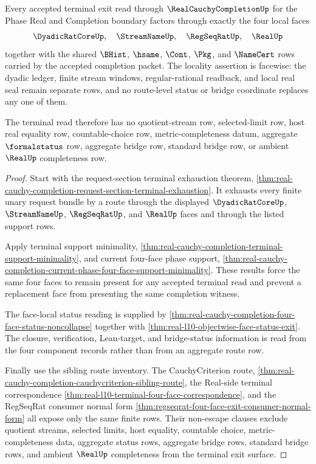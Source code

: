 \begin{theorem}
\label{thm:real-cauchy-completion-terminal-exit-locality}
Every accepted terminal exit read through $\RealCauchyCompletionUp$ for the Phase Real and Completion boundary factors through exactly the four local faces
$$
\DyadicRatCoreUp,\quad \StreamNameUp,\quad \RegSeqRatUp,\quad \RealUp
$$
together with the shared $\BHist$, $\hsame$, $\Cont$, $\Pkg$, and $\NameCert$ rows carried by the accepted completion packet. The locality assertion is facewise: the dyadic ledger, finite stream windows, regular-rational readback, and local real seal remain separate rows, and no route-level status or bridge coordinate replaces any one of them.

The terminal read therefore has no quotient-stream row, selected-limit row, host real equality row, countable-choice row, metric-completeness datum, aggregate $\formalstatus$ row, aggregate bridge row, standard bridge row, or ambient $\RealUp$ completeness row.
\end{theorem}
\begin{proof}
Start with the request-section terminal exhaustion theorem, \autoref{thm:real-cauchy-completion-request-section-terminal-exhaustion}. It exhausts every finite unary request bundle by a route through the displayed $\DyadicRatCoreUp$, $\StreamNameUp$, $\RegSeqRatUp$, and $\RealUp$ faces and through the listed support rows.

Apply terminal support minimality, \autoref{thm:real-cauchy-completion-terminal-support-minimality}, and current four-face phase support, \autoref{thm:real-cauchy-completion-current-phase-four-face-support-minimality}. These results force the same four faces to remain present for any accepted terminal read and prevent a replacement face from presenting the same completion witness.

The face-local status reading is supplied by \autoref{thm:real-cauchy-completion-four-face-status-noncollapse} together with \autoref{thm:real-l10-objectwise-face-status-exit}. The closure, verification, Lean-target, and bridge-status information is read from the four component records rather than from an aggregate route row.

Finally use the sibling route inventory. The CauchyCriterion route, \autoref{thm:real-cauchy-completion-cauchycriterion-sibling-route}, the Real-side terminal correspondence \autoref{thm:real-l10-terminal-four-face-correspondence}, and the RegSeqRat consumer normal form \autoref{thm:regseqrat-four-face-exit-consumer-normal-form} all expose only the same finite rows. Their non-escape clauses exclude quotient streams, selected limits, host equality, countable choice, metric-completeness data, aggregate status rows, aggregate bridge rows, standard bridge rows, and ambient $\RealUp$ completeness from the terminal exit surface.
\end{proof}

